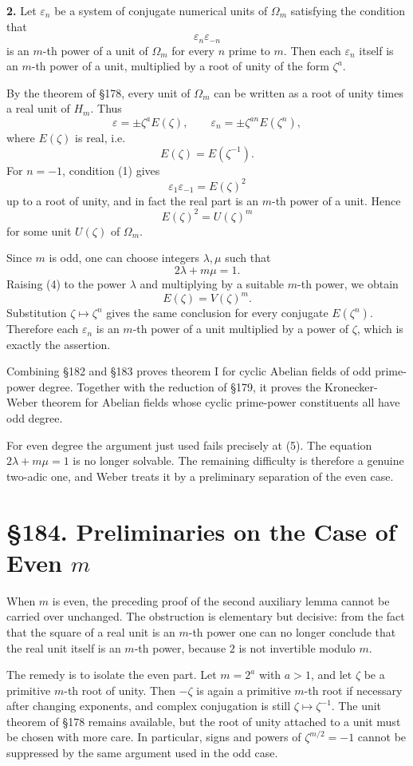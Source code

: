 \documentclass[11pt,a4paper]{book}
\newcommand{\webersection}[2]{\clearpage\section*{\S #1. #2}}
\newcommand{\zetaS}{\zeta}
\providecommand{\Om}{\Omega_m}
\providecommand{\Hm}{H_m}
\begin{document}
\textbf{2.} Let \(\varepsilon_n\) be a system of conjugate numerical units of \(\Om\) satisfying the condition that
\[
  \varepsilon_n\varepsilon_{-n}
\tag{1}
\]
is an \(m\)-th power of a unit of \(\Om\) for every \(n\) prime to \(m\).  Then each \(\varepsilon_n\) itself is an \(m\)-th power of a unit, multiplied by a root of unity of the form \(\zetaS^a\).

By the theorem of \S178, every unit of \(\Om\) can be written as a root of unity times a real unit of \(\Hm\).  Thus
\[
  \varepsilon=\pm\zetaS^a E(\zetaS),
\qquad
  \varepsilon_n=\pm\zetaS^{an}E(\zetaS^n),
\tag{2}
\]
where \(E(\zetaS)\) is real, i.e.
\[
  E(\zetaS)=E(\zetaS^{-1}).
\tag{3}
\]
For \(n=-1\), condition (1) gives
\[
  \varepsilon_1\varepsilon_{-1}=E(\zetaS)^2
\]
up to a root of unity, and in fact the real part is an \(m\)-th power of a unit.  Hence
\[
  E(\zetaS)^2=U(\zetaS)^m
\tag{4}
\]
for some unit \(U(\zetaS)\) of \(\Om\).

Since \(m\) is odd, one can choose integers \(\lambda,\mu\) such that
\[
  2\lambda+m\mu=1.
\tag{5}
\]
Raising (4) to the power \(\lambda\) and multiplying by a suitable \(m\)-th power, we obtain
\[
  E(\zetaS)=V(\zetaS)^m.
\tag{6}
\]
Substitution \(\zetaS\mapsto\zetaS^n\) gives the same conclusion for every conjugate \(E(\zetaS^n)\).  Therefore each \(\varepsilon_n\) is an \(m\)-th power of a unit multiplied by a power of \(\zetaS\), which is exactly the assertion.

Combining \S182 and \S183 proves theorem I for cyclic Abelian fields of odd prime-power degree.  Together with the reduction of \S179, it proves the Kronecker-Weber theorem for Abelian fields whose cyclic prime-power constituents all have odd degree.

For even degree the argument just used fails precisely at (5).  The equation \(2\lambda+m\mu=1\) is no longer solvable.  The remaining difficulty is therefore a genuine two-adic one, and Weber treats it by a preliminary separation of the even case.

\webersection{184}{Preliminaries on the Case of Even \(m\)}

When \(m\) is even, the preceding proof of the second auxiliary lemma cannot be carried over unchanged.  The obstruction is elementary but decisive: from the fact that the square of a real unit is an \(m\)-th power one can no longer conclude that the real unit itself is an \(m\)-th power, because \(2\) is not invertible modulo \(m\).

The remedy is to isolate the even part.  Let \(m=2^a\) with \(a>1\), and let \(\zetaS\) be a primitive \(m\)-th root of unity.  Then \(-\zetaS\) is again a primitive \(m\)-th root if necessary after changing exponents, and complex conjugation is still \(\zetaS\mapsto\zetaS^{-1}\).  The unit theorem of \S178 remains available, but the root of unity attached to a unit must be chosen with more care.  In particular, signs and powers of \(\zetaS^{m/2}=-1\) cannot be suppressed by the same argument used in the odd case.
\end{document}
